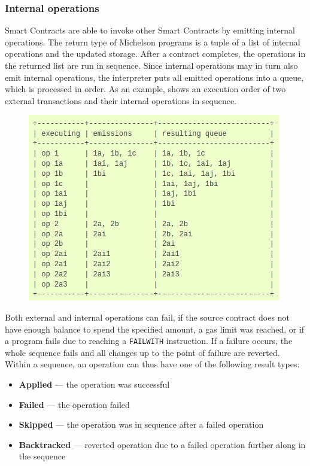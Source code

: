 \subsubsection{Internal operations}
Smart Contracts are able to invoke other Smart Contracts by emitting internal operations. The return type of Michelson programs is a tuple of a list of internal operations and the updated storage. After a contract completes, the operations in the returned list are run in sequence. Since internal operations may in turn also emit internal operations, the interpreter puts all emitted operations into a queue, which is processed in order. As an example,  shows an execution order of two external transactions and their internal operations in sequence.
\begin{figure}[h]
\centering
\includegraphics[width=0.5\linewidth]{figures/5-offline_tezos/internal_ops}
\label{fig:internal_ops}
\end{figure}

Both external and internal operations can fail, if the source contract does not have enough balance to spend the specified amount, a gas limit was reached, or if a program fails due to reaching a \texttt{FAILWITH} instruction. If a failure occurs, the whole sequence fails and all changes up to the point of failure are reverted. Within a sequence, an operation can thus have one of the following result types:
\begin{itemize}
\item \textbf{Applied} --- the operation was successful
\item \textbf{Failed} --- the operation failed
\item \textbf{Skipped} --- the operation was in sequence after a failed operation
\item \textbf{Backtracked} --- reverted operation due to a failed operation further along in the sequence
\end{itemize}

